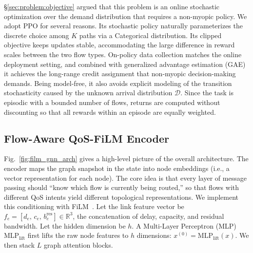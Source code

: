 \S\ref{sec:problem:objective} argued that this problem is an online stochastic optimization over the demand distribution that requires a non-myopic policy. We adopt PPO for several reasons. Its stochastic policy naturally parameterizes the discrete choice among $K$ paths via a Categorical distribution. Its clipped objective keeps updates stable, accommodating the large difference in reward scales between the two flow types. On-policy data collection matches the online deployment setting, and combined with generalized advantage estimation (GAE) it achieves the long-range credit assignment that non-myopic decision-making demands. Being model-free, it also avoids explicit modeling of the transition stochasticity caused by the unknown arrival distribution $\mathcal{D}$.
Since the task is episodic with a bounded number of flows, returns are computed without discounting so that all rewards within an episode are equally weighted. 

\subsection{Flow-Aware QoS-FiLM Encoder}
\label{sec:method:encoder}

Fig.~\ref{fig:film_gnn_arch} gives a high-level picture of the overall architecture. The encoder maps the graph snapshot in the state into node embeddings (i.e., a vector representation for each node). The core idea is that every layer of message passing should ``know which flow is currently being routed,'' so that flows with different QoS intents yield different topological representations. We implement this conditioning with FiLM~\cite{Perez2018_FiLM}. Let the link feature vector be $f_e = [d_e,\, c_e,\, b_e^{\text{res}}] \in \mathbb{R}^3$, the concatenation of delay, capacity, and residual bandwidth. Let the hidden dimension be $h$. A Multi-Layer Perceptron (MLP) $\mathrm{MLP}_{\text{lift}}$ first lifts the raw node features to $h$ dimensions: $x^{(0)}=\mathrm{MLP}_{\text{lift}}(x)$. We then stack $L$ graph attention blocks.

